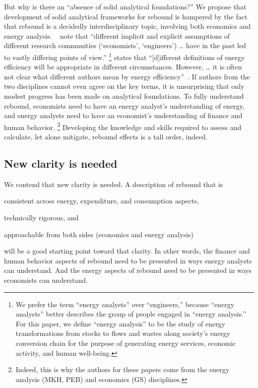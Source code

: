 \documentclass[12pt]{article}\usepackage[]{graphicx}\usepackage[]{xcolor}
\begin{document}
But why is there an ``absence of solid analytical foundations?''
We propose that development of solid analytical frameworks for rebound
is hampered by the fact that rebound is a decidedly interdisciplinary topic,
involving both economics and energy analysis. 
~\citet[p.~458]{Birol:2000wi} note that 
``different implicit and explicit assumptions of different
research communities (`economists', `engineers') \ldots{} have
in the past led to vastly differing points of view.''%
\footnote{
  We prefer the term ``energy analysts'' over ``engineers,'' 
  because ``energy analysts'' better describes 
  the group of people engaged in ``energy analysis.’'
  For this paper, we define ``energy analysis'' to be 
  the study of energy transformations 
  from stocks to flows and wastes 
  along society's energy conversion chain 
  for the purpose of generating 
  energy services, 
  economic activity, and
  human well-being.
}
\citeauthor{Turner:2013aa} states that 
``[d]ifferent definitions of energy efficiency will be appropriate in different circumstances. 
However, \ldots{} it is often not clear what different authors 
mean by energy efficiency''~\citep[p.~237--38]{Turner:2013aa}.
If authors from the two disciplines cannot even agree on the key terms, 
it is unsurprising that only modest progress has been made 
on analytical foundations.
To fully understand rebound, 
economists need to have an energy analyst's understanding of energy, and 
energy analysts need to have an economist's understanding of finance and human behavior.%
\footnote{
  Indeed, this is why the authors for these papers
  come from the energy analysis (MKH, PEB) and economics (GS) disciplines.
}
%
Developing the knowledge and skills required 
to assess and calculate, 
let alone mitigate, 
rebound effects is a tall order, indeed.


\subsection{New clarity is needed}
\label{sec:clarity_needed}

We contend that new clarity is needed.
A description of rebound that is 
%
\begin{enumerate*}[label={(\roman*)}]

  \item consistent across energy, expenditure, and consumption aspects,
  
  \item technically rigorous, and
  
  \item approachable from both sides
        (economics and energy analysis)

\end{enumerate*}
%
will be a good starting point toward that clarity.
In other words, 
the finance and human behavior aspects of rebound need to be presented 
in ways energy analysts can understand. 
And the energy aspects of rebound need to be presented
in ways economists can understand.
\end{document}
